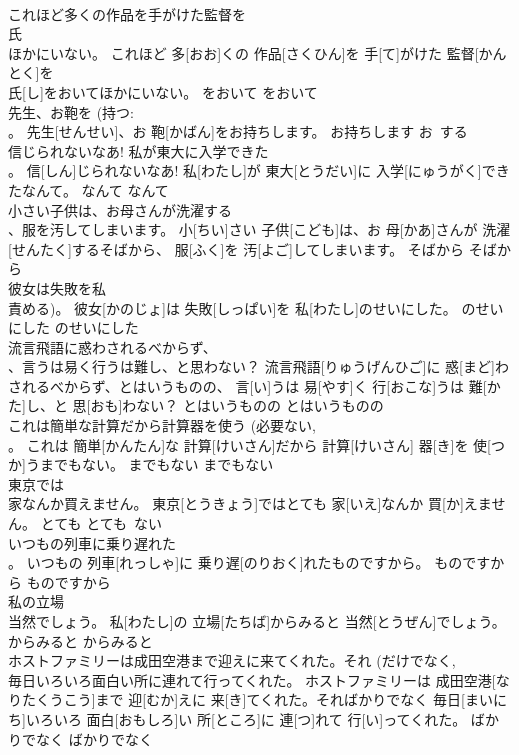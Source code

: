 \documentclass[8pt]{extreport}
\begin{document}
\begin{CJK}{UTF8}{min}
\\	これほど多くの作品を手がけた監督を
\\	氏 
\\	ほかにいない。	これほど 多[おお]くの 作品[さくひん]を 手[て]がけた 監督[かんとく]を 
\\	氏[し]をおいてほかにいない。	をおいて	をおいて	
\\	先生、お鞄を (持つ: 
\\	。	先生[せんせい]、お 鞄[かばん]をお持ちします。	お持ちします	お~する	
\\	信じられないなあ! 私が東大に入学できた 
\\	。	信[しん]じられないなあ! 私[わたし]が 東大[とうだい]に 入学[にゅうがく]できたなんて。	なんて	なんて	
\\	小さい子供は、お母さんが洗濯する 
\\	、服を汚してしまいます。	小[ちい]さい 子供[こども]は、お 母[かあ]さんが 洗濯[せんたく]するそばから、 服[ふく]を 汚[よご]してしまいます。	そばから	そばから	
\\	彼女は失敗を私
\\	責める)。	彼女[かのじょ]は 失敗[しっぱい]を 私[わたし]のせいにした。	のせいにした	のせいにした	
\\	流言飛語に惑わされるべからず、
\\	、言うは易く行うは難し、と思わない？	流言飛語[りゅうげんひご]に 惑[まど]わされるべからず、とはいうものの、 言[い]うは 易[やす]く 行[おこな]うは 難[かた]し、と 思[おも]わない？	とはいうものの	とはいうものの	
\\	これは簡単な計算だから計算器を使う (必要ない, 
\\	。	これは 簡単[かんたん]な 計算[けいさん]だから 計算[けいさん] 器[き]を 使[つか]うまでもない。	までもない	までもない	
\\	東京では 
\\	家なんか買えません。	東京[とうきょう]ではとても 家[いえ]なんか 買[か]えません。	とても	とても~ない	
\\	いつもの列車に乗り遅れた 
\\	。	いつもの 列車[れっしゃ]に 乗り遅[のりおく]れたものですから。	ものですから	ものですから	
\\	私の立場 
\\	当然でしょう。	私[わたし]の 立場[たちば]からみると 当然[とうぜん]でしょう。	からみると	からみると	
\\	ホストファミリーは成田空港まで迎えに来てくれた。それ (だけでなく, 
\\	毎日いろいろ面白い所に連れて行ってくれた。	ホストファミリーは 成田空港[なりたくうこう]まで 迎[むか]えに 来[き]てくれた。そればかりでなく 毎日[まいにち]いろいろ 面白[おもしろ]い 所[ところ]に 連[つ]れて 行[い]ってくれた。	ばかりでなく	ばかりでなく	

\end{CJK}
\end{document}
